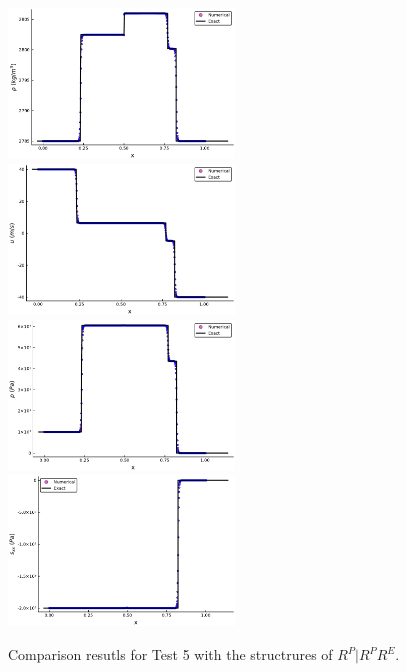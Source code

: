 \documentclass[review]{elsarticle}
\begin{document}
\begin{figure}
  \centering

  \includegraphics[width= 6cm] {case5rho.pdf}
  \includegraphics[width= 6cm] {case5u.pdf}
  \includegraphics[width= 6cm] {case5p.pdf}
  \includegraphics[width= 6cm] {case5sxx.pdf}

    \caption{Comparison resutls for Test 5 with the structrures of $R^P|R^PR^E$.  }
  \label{fig:case5}
\end{figure}
\end{document}
